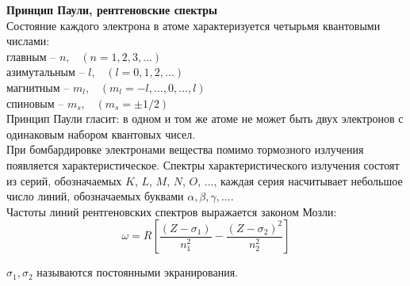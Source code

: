 \documentclass{article}
\begin{document}
	\textbf{Принцип Паули, рентгеновские спектры}\\

	Состояние каждого электрона в атоме характеризуется четырьмя квантовыми числами:\\

	главным -- $n,\;\;\;(n=1,2,3,...)$	\\

	азимутальным -- $l,\;\;\;(l=0,1,2,...)$	\\

	магнитным -- $m_l,\;\;\;(m_l=-l,...,0,...,l)$ \\

	спиновым -- $m_s,\;\;\;(m_s=\pm 1/2)$ \\

	Принцип Паули гласит: в одном и том же атоме не может быть двух электронов с одинаковым набором квантовых чисел.\\

	При бомбардировке электронами вещества помимо тормозного излучения появляется характеристическое. Спектры характеристического излучения состоят из серий, обозначаемых $K$, $L$, $M$, $N$, $O$, ..., каждая серия насчитывает небольшое число линий, обозначаемых буквами $\alpha, \beta, \gamma,...$.\\

	Частоты линий рентгеновских спектров выражается законом Мозли:
	\begin{equation}
		\omega = R[\frac{(Z-\sigma_1)}{n_1^2}-\frac{(Z-\sigma_2)^2}{n_2^2}]
	\end{equation}

	$\sigma_1, \sigma_2$ называются постоянными экранирования.
\end{document}
